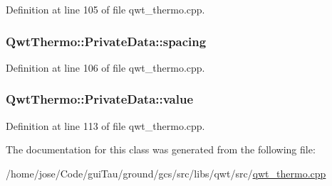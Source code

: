 Definition at line 105 of file qwt\-\_\-thermo.\-cpp.

\hypertarget{class_qwt_thermo_1_1_private_data_acd7c6225fec7dcba8449af63c9ad5d20}{
\subsubsection[{spacing}]{ Qwt\-Thermo\-::\-Private\-Data\-::spacing}}\label{class_qwt_thermo_1_1_private_data_acd7c6225fec7dcba8449af63c9ad5d20}


Definition at line 106 of file qwt\-\_\-thermo.\-cpp.

\hypertarget{class_qwt_thermo_1_1_private_data_a3a6caeedc1218f76a908981798367f33}{
\subsubsection[{value}]{ Qwt\-Thermo\-::\-Private\-Data\-::value}}\label{class_qwt_thermo_1_1_private_data_a3a6caeedc1218f76a908981798367f33}


Definition at line 113 of file qwt\-\_\-thermo.\-cpp.



The documentation for this class was generated from the following file\-:\begin{DoxyCompactItemize}
\item 
/home/jose/\-Code/gui\-Tau/ground/gcs/src/libs/qwt/src/\hyperlink{qwt__thermo_8cpp}{qwt\-\_\-thermo.\-cpp}\end{DoxyCompactItemize}
